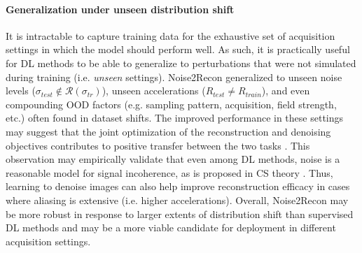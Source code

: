 \documentclass[10pt,twocolumn,letterpaper]{article}
\newcommand{\noiserange}{\mathcal{R}(\sigma_{tr})}
\newcommand{\testnoise}{\sigma_{test}}
\newcommand{\RV}[1]{{#1}}
\begin{document}
\paragraph{Generalization under unseen distribution shift} It is intractable to capture training data for the exhaustive set of acquisition settings in which the model should perform well. As such, it is practically useful for DL methods to be able to generalize to perturbations that were not simulated during training (i.e. \textit{unseen} settings). Noise2Recon generalized to unseen noise levels ($\testnoise \notin \noiserange$), unseen accelerations ($R_{test} \neq R_{train}$), and even \RV{compounding OOD factors (e.g. sampling pattern, acquisition, field strength, etc.) often found in dataset shifts}. The improved performance in these settings may suggest that the joint optimization of the reconstruction and denoising objectives contributes to positive transfer between the two tasks \cite{wu2020understanding}. This observation may empirically validate that even among DL methods, noise is a reasonable model for signal incoherence, as is proposed in CS theory \cite{Lustig_Donoho_Pauly_2007}. Thus, learning to denoise images can also help improve reconstruction efficacy in cases where aliasing is extensive (i.e. higher accelerations). Overall, Noise2Recon may be more robust in response to larger extents of distribution shift than supervised DL methods and may be a more viable candidate for deployment in different acquisition settings.


\end{document}
